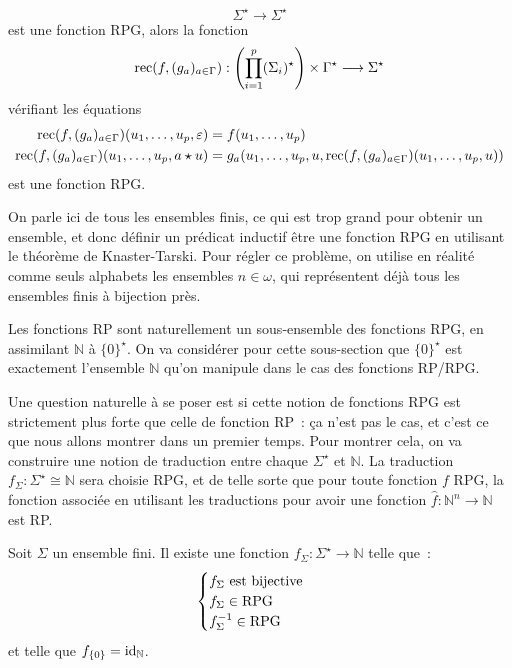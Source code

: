\begin{definition}
\begin{itemize}
\[    \Sigma^\star\to\Sigma^\star\]
    est une fonction RPG, alors la fonction
    \[\operatorname{rec}(f,(g_a)_{a \in \Gamma}) : \left(\prod_{i = 1}^p (\Sigma_i)^\star\right)
    \times \Gamma^\star \longrightarrow \Sigma^\star \]
    vérifiant les équations
    \begin{align*}
      \operatorname{rec}(f,(g_a)_{a\in\Gamma})(u_1,\ldots,u_p,\varepsilon) &=
      f(u_1,\ldots,u_p)\\
      \operatorname{rec}(f,(g_a)_{a\in\Gamma})(u_1,\ldots,u_p,a\star u) &=
      g_a(u_1,\ldots,u_p,u,\operatorname{rec}(f,(g_a)_{a \in \Gamma})(u_1,\ldots,u_p,u))
    \end{align*}
    est une fonction RPG.
  \end{itemize}
\end{definition}

\begin{remark}
  On parle ici de tous les ensembles finis, ce qui est trop grand pour obtenir
  un ensemble, et donc définir un prédicat inductif \og être une fonction RPG\fg
  en utilisant le théorème de Knaster-Tarski. Pour régler ce problème, on
  utilise en réalité comme seuls alphabets les ensembles $n \in \omega$, qui
  représentent déjà tous les ensembles finis à bijection près.
\end{remark}

Les fonctions RP sont naturellement un sous-ensemble des fonctions RPG, en
assimilant $\mathbb N$ à $\{0\}^\star$. On va considérer pour cette sous-section
que $\{0\}^\star$ est exactement l'ensemble $\mathbb N$ qu'on manipule dans le
cas des fonctions RP/RPG.

Une question naturelle à se poser est si cette notion de fonctions RPG est
strictement plus forte que celle de fonction RP~: ça n'est pas le cas, et c'est
ce que nous allons montrer dans un premier temps. Pour montrer cela, on va
construire une notion de traduction entre chaque $\Sigma^\star$ et $\mathbb N$.
La traduction $f_\Sigma : \Sigma^\star \cong \mathbb N$ sera choisie RPG, et de
telle sorte que pour toute fonction $f$ RPG, la fonction associée en utilisant
les traductions pour avoir une fonction $\hat{f} : \mathbb N^n \to \mathbb N$
est RP.

\begin{definition}
  Soit $\Sigma$ un ensemble fini. Il existe une fonction
  $f_\Sigma : \Sigma^\star \to \mathbb N$ telle que~:
  \[\begin{cases}
  f_\Sigma\text{ est bijective }\\
  f_\Sigma\in \operatorname{RPG}\\
  f^{-1}_\Sigma\in\operatorname{RPG}
  \end{cases}\]
  et telle que $f_{\{0\}} = \operatorname{id}_{\mathbb N}$.
\end{definition}

